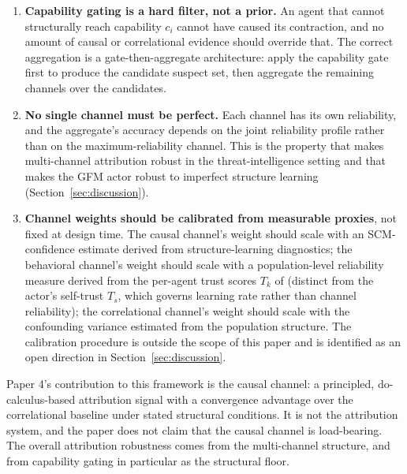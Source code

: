 \begin{enumerate}
\item \textbf{Capability gating is a hard filter, not a prior.}
    An agent that cannot structurally reach capability $c_i$ cannot
    have caused its contraction, and no amount of causal or
    correlational evidence should override that. The correct
    aggregation is a gate-then-aggregate architecture: apply the
    capability gate first to produce the candidate suspect set, then
    aggregate the remaining channels over the candidates.
\item \textbf{No single channel must be perfect.} Each channel has
    its own reliability, and the aggregate's accuracy depends on
    the joint reliability profile rather than on the
    maximum-reliability channel. This is the property that makes
    multi-channel attribution robust in the threat-intelligence
    setting and that makes the GFM actor robust to imperfect
    structure learning (Section~\ref{sec:discussion}).
\item \textbf{Channel weights should be calibrated from
    measurable proxies}, not fixed at design time. The causal
    channel's weight should scale with an SCM-confidence estimate
    derived from structure-learning diagnostics; the behavioral
    channel's weight should scale with a population-level
    reliability measure derived from the per-agent trust scores
    $T_k$ of \citet{lasser2026gfm} (distinct from the actor's
    self-trust $T_s$, which governs learning rate rather than
    channel reliability); the correlational channel's weight
    should scale with the confounding variance estimated from the
    population structure. The calibration procedure is outside the
    scope of this paper and is identified as an open direction in
    Section~\ref{sec:discussion}.
\end{enumerate}

Paper 4's contribution to this framework is the causal channel: a
principled, do-calculus-based attribution signal with a convergence
advantage over the correlational baseline under stated structural
conditions. It is not the attribution system, and the paper does not
claim that the causal channel is load-bearing. The overall
attribution robustness comes from the multi-channel structure, and
from capability gating in particular as the structural floor.
